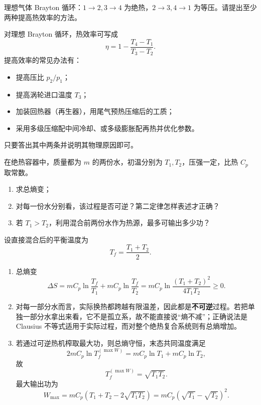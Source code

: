 \begin{question}
理想气体 Brayton 循环：$1\to2,3\to4$ 为绝热，$2\to3,4\to1$ 为等压。请提出至少两种提高热效率的方法。
\begin{solution}
对理想 Brayton 循环，热效率可写成
\[
\eta=1-\frac{T_4-T_1}{T_3-T_2}.
\]
提高效率的常见办法有：
\begin{itemize}[leftmargin=1.8em,itemsep=0.2em]
\item 提高压比 $p_2/p_1$；
\item 提高涡轮进口温度 $T_3$；
\item 加装回热器（再生器），用尾气预热压缩后的工质；
\item 采用多级压缩配中间冷却、或多级膨胀配再热并优化参数。
\end{itemize}
只要答出其中两条并说明其物理原因即可。
\end{solution}
\end{question}

\begin{question}
在绝热容器中，质量都为 $m$ 的两份水，初温分别为 $T_1,T_2$，压强一定，比热 $C_p$ 取常数。
\begin{enumerate}[label=(\arabic*),leftmargin=2.8em,itemsep=0.2em]
\item 求总熵变；
\item 对每一份水分别看，该过程是否可逆？第二定律怎样表述才正确？
\item 若 $T_1>T_2$，利用混合前两份水作为热源，最多可输出多少功？
\end{enumerate}
\begin{solution}
设直接混合后的平衡温度为
\[
T_f=\frac{T_1+T_2}{2}.
\]
\begin{enumerate}[label=(\arabic*),leftmargin=2.8em,itemsep=0.2em]
\item 总熵变
\[
\Delta S=mC_p\ln\frac{T_f}{T_1}+mC_p\ln\frac{T_f}{T_2}
=mC_p\ln\frac{(T_1+T_2)^2}{4T_1T_2}\ge 0.
\]
\item 对每一部分水而言，实际换热都跨越有限温差，因此都是\textbf{不可逆}过程。若把单独一部分水拿出来看，它不是孤立系，故不能直接说“熵不减”；正确说法是 Clausius 不等式适用于实际过程，而对整个绝热复合系统则有总熵增加。
\item 若通过可逆热机榨取最大功，则总熵守恒，末态共同温度满足
\[
2mC_p\ln T_f^{(\max W)}=mC_p\ln T_1+mC_p\ln T_2,
\]
故
\[
T_f^{(\max W)}=\sqrt{T_1T_2}.
\]
最大输出功为
\[
W_{\max}=mC_p(T_1+T_2-2\sqrt{T_1T_2})
=mC_p(\sqrt{T_1}-\sqrt{T_2})^2.
\]
\end{enumerate}

\end{solution}
\end{question}

